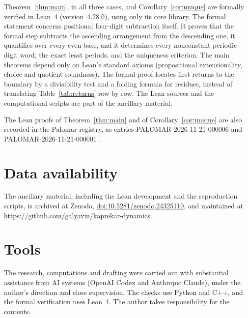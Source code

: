 \documentclass[11pt]{amsart}
\theoremstyle{definition}
\theoremstyle{remark}
\begin{document}
Theorem~\ref{thm:main}, in all three cases, and Corollary~\ref{cor:unique} are formally verified in Lean~4 (version~4.28.0), using only its core library. The formal statement concerns positional four-digit subtraction itself. It proves that the formal step subtracts the ascending arrangement from the descending one, it quantifies over every even base, and it determines every nonconstant periodic digit word, the exact least periods, and the uniqueness criterion. The main theorems depend only on Lean's standard axioms (propositional extensionality, choice and quotient soundness). The formal proof locates first returns to the boundary by a divisibility test and a folding formula for residues, instead of translating Table~\ref{tab:returns} row by row. The Lean sources and the computational scripts are part of the ancillary material.

The Lean proofs of Theorem~\ref{thm:main} and of Corollary~\ref{cor:unique} are also recorded in the Palomar registry, as entries PALOMAR-2026-11-21-000006 \cite{Pal6} and PALOMAR-2026-11-21-000001 \cite{Pal1}.

\section*{Data availability}
The ancillary material, including the Lean development and the reproduction scripts, is archived at Zenodo, \href{https://doi.org/10.5281/zenodo.24325110}{doi:10.5281/zenodo.24325110}, and maintained at \url{https://github.com/galyavin/kaprekar-dynamics}.

\section*{Tools}
The research, computations and drafting were carried out with substantial assistance from AI systems (OpenAI Codex and Anthropic Claude), under the author's direction and close supervision. The checks use Python and C++, and the formal verification uses Lean~4. The author takes responsibility for the contents.
\end{document}
